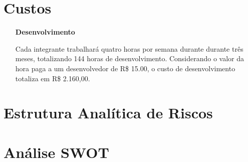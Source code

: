 \documentclass[]{article}
\begin{document}


\section{Custos} %
\label{sec:custos}

\begin{itemize}
  \item[\textbf{Desenvolvimento}]
  
  Cada integrante trabalhará quatro horas por semana durante durante três meses, totalizando 144 horas de desenvolvimento. Considerando o valor da hora paga a um desenvolvedor de R\$ 15.00, o custo de desenvolvimento totaliza em R\$ 2.160,00.
  
  
\end{itemize}



\section{Estrutura Analítica de Riscos} %
\label{sec:estrutura_analitica_de_riscos}


\section{Análise SWOT} %
\label{sec:analise_swot}
\end{document}
